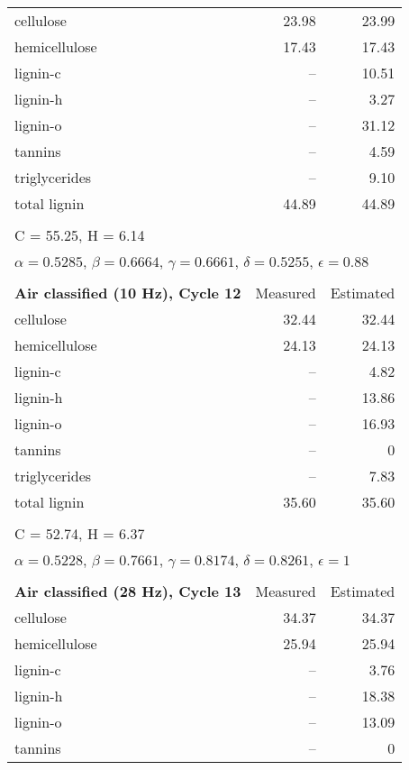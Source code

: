 \begin{longtable}{p{8cm}rr}
    \midrule
    cellulose     & 23.98 & 23.99 \\
    hemicellulose & 17.43 & 17.43 \\
    lignin-c      & --    & 10.51 \\
    lignin-h      & --    & 3.27 \\
    lignin-o      & --    & 31.12 \\
    tannins       & --    & 4.59 \\
    triglycerides & --    & 9.10 \\
    total lignin  & 44.89 & 44.89 \\
    \\
    \multicolumn{3}{l}{C = 55.25, H = 6.14} \\
    \multicolumn{3}{l}{$\alpha = 0.5285$, $\beta = 0.6664$, $\gamma = 0.6661$, $\delta = 0.5255$, $\epsilon = 0.88$} \\
    \\
    \textbf{Air classified (10 Hz), Cycle 12} & Measured & Estimated \\
    \midrule
    cellulose     & 32.44 & 32.44 \\
    hemicellulose & 24.13 & 24.13 \\
    lignin-c      & --    & 4.82 \\
    lignin-h      & --    & 13.86 \\
    lignin-o      & --    & 16.93 \\
    tannins       & --    & 0 \\
    triglycerides & --    & 7.83 \\
    total lignin  & 35.60 & 35.60 \\
    \\
    \multicolumn{3}{l}{C = 52.74, H = 6.37} \\
    \multicolumn{3}{l}{$\alpha = 0.5228$, $\beta = 0.7661$, $\gamma = 0.8174$, $\delta = 0.8261$, $\epsilon = 1$} \\
    \\
    \textbf{Air classified (28 Hz), Cycle 13} & Measured & Estimated \\
    \midrule
    cellulose     & 34.37 & 34.37 \\
    hemicellulose & 25.94 & 25.94 \\
    lignin-c      & --    & 3.76 \\
    lignin-h      & --    & 18.38 \\
    lignin-o      & --    & 13.09 \\
    tannins       & --    & 0 \\

\end{longtable}
